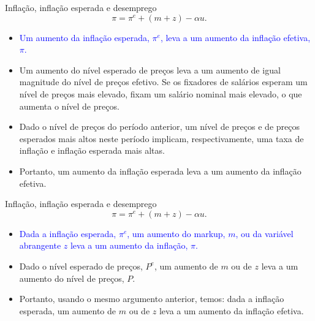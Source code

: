 \documentclass[10pt]{beamer}
\begin{document}
\begin{frame}{Inflação, inflação esperada e desemprego}
    \begin{equation*}
        \pi = \pi^e + (m + z) - \alpha u.
    \end{equation*}
    \bigskip
    \begin{itemize}
        \item \textcolor{blue}{Um aumento da inflação esperada, $\pi^e$, leva a um aumento da inflação efetiva, $\pi$.}
        \bigskip
        \item Um aumento do nível esperado de preços leva a um aumento de igual magnitude do nível de preços efetivo. Se os fixadores de salários esperam um nível de preços mais elevado, fixam um salário nominal mais elevado, o que aumenta o nível de preços.
        \bigskip
        \item Dado o nível de preços do período anterior, um nível de preços e de preços esperados mais altos neste período implicam, respectivamente, uma taxa de inflação e inflação esperada mais altas.
        \bigskip
        \item Portanto, um aumento da inflação esperada leva a um aumento da inflação efetiva.
    \end{itemize}
\end{frame}

\begin{frame}{Inflação, inflação esperada e desemprego}
    \begin{equation*}
        \pi = \pi^e + (m + z) - \alpha u.
    \end{equation*}
    \bigskip
    \begin{itemize}
        \item \textcolor{blue}{Dada a inflação esperada, $\pi^e$, um aumento do markup, $m$, ou da variável abrangente $z$ leva a um aumento da inflação, $\pi$.}
        \bigskip
        \item Dado o nível esperado de preços, $P^e$, um aumento de $m$ ou de $z$ leva a um aumento do nível de preços, $P$.
        \bigskip
        \item Portanto, usando o mesmo argumento anterior, temos: dada a inflação esperada, um aumento de $m$ ou de $z$ leva a um aumento da inflação efetiva.
    \end{itemize}
\end{frame}
\end{document}
